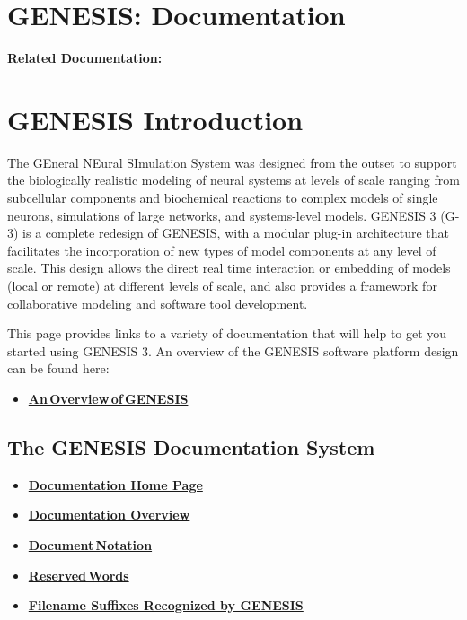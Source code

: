\documentclass[12pt]{article}
\begin{document}
\section*{GENESIS: Documentation}

{\bf Related Documentation:}

\section*{GENESIS Introduction}

The GEneral NEural SImulation System was designed from the outset
to support the biologically realistic modeling of neural systems at levels
of scale ranging from subcellular components and biochemical reactions to
complex models of single neurons, simulations of large networks, and
systems-level models.  GENESIS 3 (G-3) is a complete redesign of GENESIS,
with a modular plug-in architecture that facilitates the incorporation of
new types of model components at any level of scale.  This design allows
the direct real time interaction or embedding of models (local or remote)
at different levels of scale, and also provides a framework for
collaborative modeling and software tool development.

This page provides links to a variety of documentation that will help to get you started
using GENESIS 3. An overview of the GENESIS software platform design can be found here:


\begin{itemize}
\item \href{../genesis-overview/genesis-overview.tex}{\bf An\,Overview\,of\,GENESIS}
\end{itemize}


\subsection*{The GENESIS Documentation System}
\begin{itemize}
\item \href{../documentation-homepage/documentation-homepage.tex}{\bf Documentation Home Page}
\item \href{../documentation-overview/documentation-overview.tex}{\bf Documentation Overview}
\item \href{../document-notation/document-notation.tex}{\bf Document\,Notation}
\item \href{../reserved-words/reserved-words.tex}{\bf Reserved\,Words}
\item \href{../common-suffixes/common-suffixes.tex}{\bf Filename Suffixes Recognized by GENESIS} 
\end{itemize}
\end{document}
